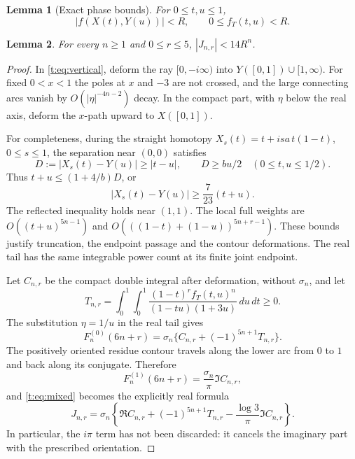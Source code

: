 \documentclass[10pt,a4paper]{amsart}
\newtheorem{lemma}{Lemma}
\newcommand{\dd}{\,d}
\begin{document}
\begin{lemma}[Exact phase bounds]\label{t:lem:phases}
For $0\le t,u\le1$,
\[
 |f(X(t),Y(u))|<R,\qquad 0\le f_T(t,u)<R.
\]
\end{lemma}

\begin{lemma}\label{t:lem:bound}
For every $n\ge1$ and $0\le r\le5$, $|J_{n,r}|<14R^n$.
\end{lemma}

\begin{proof}
In \eqref{t:eq:vertical}, deform the ray $[0,-i\infty)$ into
$Y([0,1])\cup[1,\infty)$. For fixed $0<x<1$ the poles at $x$ and $-3$
are not crossed, and the large connecting arcs vanish by
$O(|\eta|^{-4n-2})$ decay. In the compact part, with $\eta$ below the real
axis, deform the $x$-path upward to $X([0,1])$.

For completeness, during the straight homotopy
$X_s(t)=t+isa\,t(1-t)$, $0\le s\le1$, the separation near $(0,0)$ satisfies
\[
 D:=|X_s(t)-Y(u)|\ge|t-u|,\qquad D\ge bu/2
 \quad(0\le t,u\le1/2).
\]
Thus $t+u\le(1+4/b)D$, or
\begin{equation}\label{t:eq:separation}
 |X_s(t)-Y(u)|\ge\frac7{23}(t+u).
\end{equation}
The reflected inequality holds near $(1,1)$. The local full weights are
$O((t+u)^{5n-1})$ and
$O(((1-t)+(1-u))^{5n+r-1})$. These bounds justify truncation, the
endpoint passage and the contour deformations. The real tail has the same
integrable power count at its finite joint endpoint.

Let $C_{n,r}$ be the compact double integral after deformation, without
$\sigma_n$, and let
\[
 T_{n,r}=\int_0^1\!\int_0^1
 \frac{(1-t)^r f_T(t,u)^n}{(1-tu)(1+3u)}\dd u\dd t\ge0.
\]
The substitution $\eta=1/u$ in the real tail gives
\begin{equation}\label{t:eq:split}
 F_n^{(0)}(6n+r)=\sigma_n\{C_{n,r}+(-1)^{5n+1}T_{n,r}\}.
\end{equation}
The positively oriented residue contour travels along the lower arc from
$0$ to $1$ and back along its conjugate. Therefore
\[
 F_n^{(1)}(6n+r)=\frac{\sigma_n}{\pi}\Im C_{n,r},
\]
and \eqref{t:eq:mixed} becomes the explicitly real formula
\begin{equation}\label{t:eq:real-form}
 J_{n,r}=\sigma_n\left\{\Re C_{n,r}+(-1)^{5n+1}T_{n,r}
               -\frac{\log3}{\pi}\Im C_{n,r}\right\}.
\end{equation}
In particular, the $i\pi$ term has not been discarded: it cancels the
imaginary part with the prescribed orientation.


\end{proof}
\end{document}
